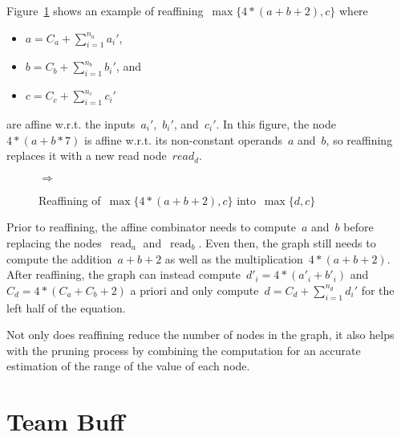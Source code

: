 \documentclass{article}
\DeclareMathOperator{\readNode}{read}
\begin{document}
Figure~\ref{fig:optimization:reaffine} shows an example of reaffining~$\max\{4 * (a + b + 2), c\}$ where
\begin{itemize}
  \item $a=C_a + \sum_{i=1}^{n_a}a_i'$,
  \item $b=C_b + \sum_{i=1}^{n_b}b_i'$, and
  \item $c=C_c + \sum_{i=1}^{n_c}c_i'$
\end{itemize}
are affine w.r.t. the inputs~${a_i'}$,~$b_i'$, and~$c_i'$.
In this figure, the node~$4 * (a + b * 7)$ is affine w.r.t. its non-constant operands~$a$ and~$b$, so reaffining replaces it with a new read node~$read_d$.
%
\begin{figure}
  \centering
  \quad$\Rightarrow$\quad
  \caption{Reaffining of~$\max\{4 * (a + b + 2), c\}$ into~$\max\{d, c\}$}
  \label{fig:optimization:reaffine}
\end{figure}

Prior to reaffining, the affine combinator needs to compute~$a$ and~$b$ before replacing the nodes~$\readNode_a$ and~$\readNode_b$.
Even then, the graph still needs to compute the addition~$a + b + 2$ as well as the multiplication~$4 * (a + b + 2)$.
After reaffining, the graph can instead compute~$d'_i = 4 * (a'_i + b'_i)$ and~$C_d = 4 * (C_a + C_b + 2)$ a priori and only compute~$d=C_d + \sum_{i=1}^{n_d}d_i'$ for the left half of the equation.

Not only does reaffining reduce the number of nodes in the graph, it also helps with the pruning process by combining the computation for an accurate estimation of the range of the value of each node.

\section{Team Buff}
\end{document}
